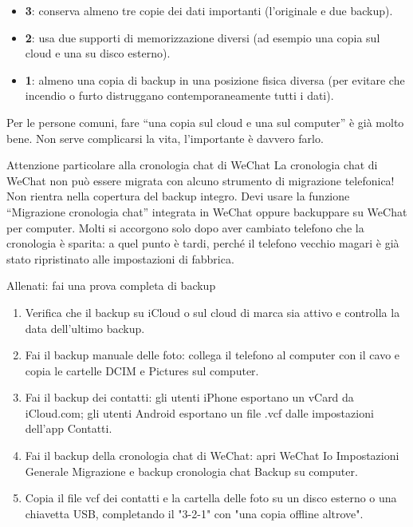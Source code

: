 \begin{itemize}
  \item \textbf{3}: conserva almeno tre copie dei dati importanti (l'originale e due backup).
  \item \textbf{2}: usa due supporti di memorizzazione diversi (ad esempio una copia sul cloud e una su disco esterno).
  \item \textbf{1}: almeno una copia di backup in una posizione fisica diversa (per evitare che incendio o furto distruggano contemporaneamente tutti i dati).
\end{itemize}

Per le persone comuni, fare “una copia sul cloud e una sul computer” è già molto bene. Non serve complicarsi la vita, l'importante è davvero farlo.

\begin{tcbwarn}{Attenzione particolare alla cronologia chat di WeChat}
La cronologia chat di WeChat non può essere migrata con alcuno strumento di migrazione telefonica! Non rientra nella copertura del backup integro. Devi usare la funzione “Migrazione cronologia chat” integrata in WeChat oppure backuppare su WeChat per computer. Molti si accorgono solo dopo aver cambiato telefono che la cronologia è sparita: a quel punto è tardi, perché il telefono vecchio magari è già stato ripristinato alle impostazioni di fabbrica.

\end{tcbwarn}

\begin{tcbpractice}{Allenati: fai una prova completa di backup}
\begin{enumerate}
  \item Verifica che il backup su iCloud o sul cloud di marca sia attivo e controlla la data dell'ultimo backup.
  \item Fai il backup manuale delle foto: collega il telefono al computer con il cavo e copia le cartelle DCIM e Pictures sul computer.
  \item Fai il backup dei contatti: gli utenti iPhone esportano un vCard da iCloud.com; gli utenti Android esportano un file .vcf dalle impostazioni dell'app Contatti.
  \item Fai il backup della cronologia chat di WeChat: apri WeChat Io Impostazioni Generale Migrazione e backup cronologia chat Backup su computer.
  \item Copia il file vcf dei contatti e la cartella delle foto su un disco esterno o una chiavetta USB, completando il "3-2-1" con "una copia offline altrove".
\end{enumerate}

\end{tcbpractice}
